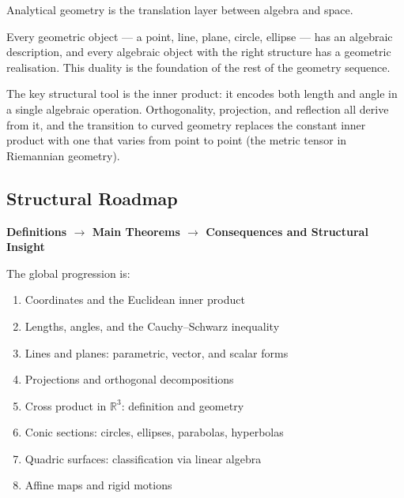

\begin{tcolorbox}[
  colback=gray!6,
  colframe=gray!40,
  arc=2pt,
  left=8pt, right=8pt, top=6pt, bottom=6pt,
  title={\small\textbf{Structural Role: Analytical Geometry — Algebra Meets Space}},
  fonttitle=\small\bfseries
]
Analytical geometry is the translation layer between algebra and
space.

Every geometric object — a point, line, plane, circle, ellipse —
has an algebraic description, and every algebraic object with
the right structure has a geometric realisation.
This duality is the foundation of the rest of the geometry
sequence.

The key structural tool is the inner product: it encodes both
length and angle in a single algebraic operation.
Orthogonality, projection, and reflection all derive from it,
and the transition to curved geometry replaces the constant
inner product with one that varies from point to point
(the metric tensor in Riemannian geometry).
\end{tcolorbox}
\vspace{1em}

\subsection*{Structural Roadmap}

\begin{center}
\textbf{Definitions $\longrightarrow$ Main Theorems
$\longrightarrow$ Consequences and Structural Insight}
\end{center}

The global progression is:

\begin{enumerate}
  \item Coordinates and the Euclidean inner product
  \item Lengths, angles, and the Cauchy--Schwarz inequality
  \item Lines and planes: parametric, vector, and scalar forms
  \item Projections and orthogonal decompositions
  \item Cross product in $\mathbb{R}^3$: definition and geometry
  \item Conic sections: circles, ellipses, parabolas, hyperbolas
  \item Quadric surfaces: classification via linear algebra
  \item Affine maps and rigid motions
\end{enumerate}


